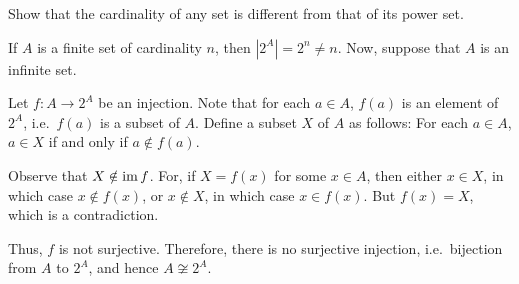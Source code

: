 \begin{Exercise}
Show that the cardinality of any set is different from that of its power set.
\end{Exercise}

\begin{Solution*}
If $A$ is a finite set of cardinality $n$, then $|2^A| = 2^n \ne n$. Now, suppose that $A$ is an infinite set.

Let $f \colon A \to 2^A$ be an injection. Note that for each $a \in A$, $f(a)$ is an element of $2^A$, i.e.\ $f(a)$ is a subset of $A$. Define a subset $X$ of $A$ as follows: For each $a \in A$, $a \in X$ if and only if $a \notin f(a)$.

Observe that $X \notin \operatorname{im} f$. For, if $X = f(x)$ for some $x \in A$, then either $x \in X$, in which case $x \notin f(x)$, or $x \notin X$, in which case $x \in f(x)$. But $f(x) = X$, which is a contradiction.

Thus, $f$ is not surjective. Therefore, there is no surjective injection, i.e.\ bijection from $A$ to $2^A$, and hence $A \not\cong 2^A$.
\end{Solution*}